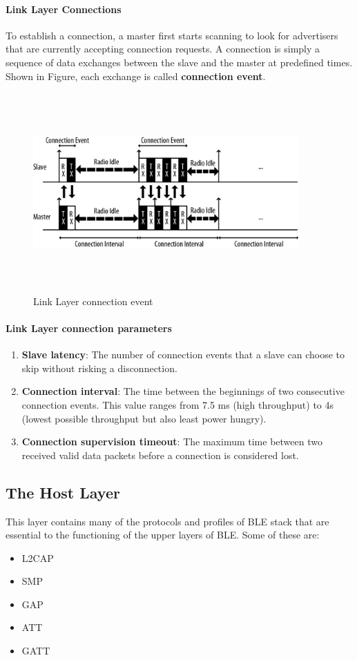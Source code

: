\paragraph{Link Layer Connections}
To establish a connection, a master first starts scanning to look for advertisers that are currently accepting connection requests. A connection is simply a sequence of data exchanges between the slave and the master at predefined times. Shown in Figure, each exchange is called \textbf{connection event}.
\begin{figure}[ht]
	\centering
	\includegraphics[width=4.0in, height=3in]{images/connection_event.png}
	\caption{Link Layer connection event}
\end{figure}
\paragraph{Link Layer connection parameters}
\begin{enumerate}
	\item \textbf{Slave latency}: The number of connection events that a slave can choose to skip without risking a disconnection.
	\item \textbf{Connection interval}: The time between the beginnings of two consecutive connection events. This value ranges from 7.5 ms (high throughput) to 4s (lowest possible throughput but also least power hungry).
	\item \textbf{Connection supervision timeout}: The maximum time between two received valid data packets before a connection is considered lost.
\end{enumerate}
\subsection{The Host Layer}
This layer contains many of the protocols and profiles of BLE stack that are essential to the functioning of the upper layers of BLE. Some of these are:
\begin{itemize}
	\item L2CAP
	\item SMP
	\item GAP
	\item ATT
	\item GATT
\end{itemize}
